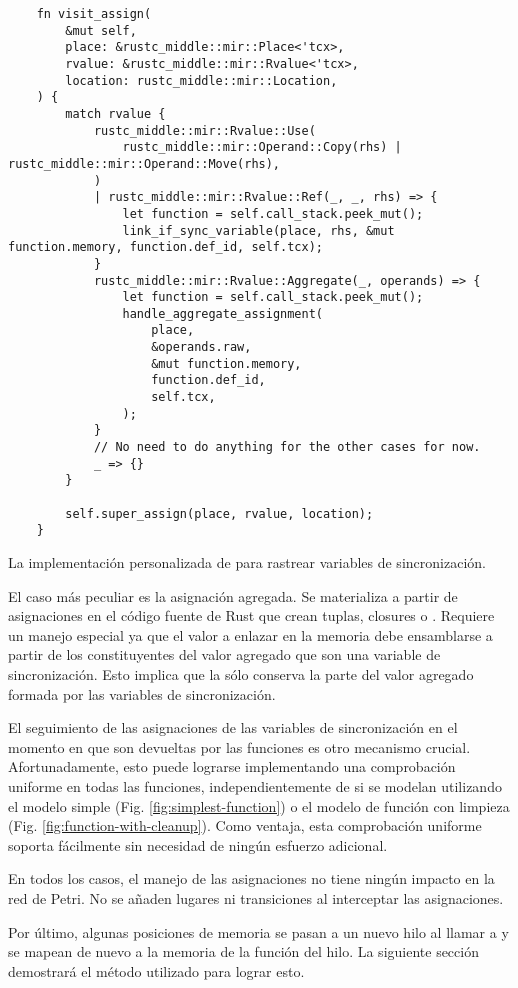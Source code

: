 \begin{listing}[!htb]
  \begin{verbatim}
    fn visit_assign(
        &mut self,
        place: &rustc_middle::mir::Place<'tcx>,
        rvalue: &rustc_middle::mir::Rvalue<'tcx>,
        location: rustc_middle::mir::Location,
    ) {
        match rvalue {
            rustc_middle::mir::Rvalue::Use(
                rustc_middle::mir::Operand::Copy(rhs) | rustc_middle::mir::Operand::Move(rhs),
            )
            | rustc_middle::mir::Rvalue::Ref(_, _, rhs) => {
                let function = self.call_stack.peek_mut();
                link_if_sync_variable(place, rhs, &mut function.memory, function.def_id, self.tcx);
            }
            rustc_middle::mir::Rvalue::Aggregate(_, operands) => {
                let function = self.call_stack.peek_mut();
                handle_aggregate_assignment(
                    place,
                    &operands.raw,
                    &mut function.memory,
                    function.def_id,
                    self.tcx,
                );
            }
            // No need to do anything for the other cases for now.
            _ => {}
        }

        self.super_assign(place, rvalue, location);
    }
  \end{verbatim}
  \caption{La implementación personalizada de  para rastrear variables de sincronización.}
  \label{lst:visit-assign}
\end{listing}

El caso más peculiar es la asignación agregada. Se materializa a partir de asignaciones en el
código fuente de Rust que crean tuplas, closures o . Requiere un manejo especial ya
que el valor a enlazar en la memoria debe ensamblarse a partir de los constituyentes del valor agregado que
son una variable de sincronización. Esto implica que la  sólo conserva la parte del valor
agregado formada por las variables de sincronización.

El seguimiento de las asignaciones de las variables de sincronización en el momento en que
son devueltas por las funciones es otro mecanismo crucial. Afortunadamente, esto puede
lograrse implementando una comprobación uniforme en todas las funciones,
independientemente de si se modelan utilizando el modelo simple (Fig. \ref{fig:simplest-function}) o el modelo de
función con limpieza (Fig. \ref{fig:function-with-cleanup}). Como ventaja, esta comprobación uniforme
soporta fácilmente  sin necesidad de ningún esfuerzo adicional.

En todos los casos, el manejo de las asignaciones no tiene ningún impacto en la red de Petri.
No se añaden lugares ni transiciones al interceptar las asignaciones.

Por último, algunas posiciones de memoria se pasan a un nuevo hilo al llamar a
 y se mapean de nuevo a la memoria de la función del hilo. La siguiente
sección demostrará el método utilizado para lograr esto.